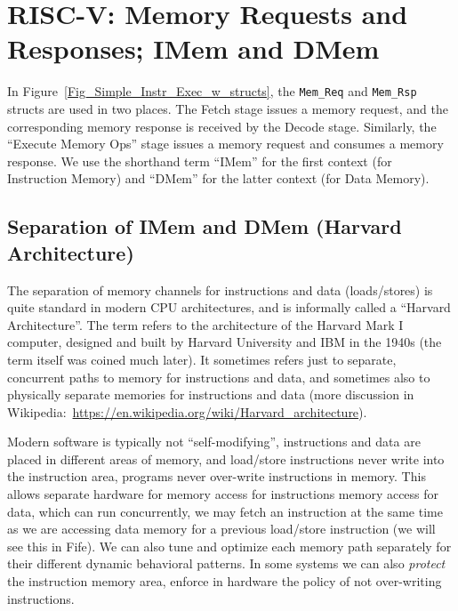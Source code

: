 
\section{RISC-V: Memory Requests and Responses; IMem and DMem}


In Figure~\ref{Fig_Simple_Instr_Exec_w_structs}, the \verb|Mem_Req|
and \verb|Mem_Rsp| structs are used in two places.  The Fetch stage
issues a memory request, and the corresponding memory response is
received by the Decode stage.  Similarly, the ``Execute Memory Ops''
stage issues a memory request and consumes a memory response.  We use
the shorthand term ``IMem'' for the first context (for Instruction
Memory) and ``DMem'' for the latter context (for Data Memory).


\subsection{Separation of IMem and DMem (Harvard Architecture)}

\label{Sec_Harvard_architecture}


The separation of memory channels for instructions and data
(loads/stores) is quite standard in modern CPU architectures, and is
informally called a ``Harvard Architecture''.  The term refers to the
architecture of the Harvard Mark I computer, designed and built by
Harvard University and IBM in the 1940s (the term itself was coined
much later).  It sometimes refers just to separate, concurrent paths
to memory for instructions and data, and sometimes also to physically
separate memories for instructions and data (more discussion in
Wikipedia:~\url{https://en.wikipedia.org/wiki/Harvard_architecture}).

Modern software is typically not ``self-modifying'', {\ie}
instructions and data are placed in different areas of memory, and
load/store instructions never write into the instruction area, {\ie}
programs never over-write instructions in memory.  This allows
separate hardware for memory access for instructions {\vs} memory
access for data, which can run concurrently, {\ie} we may fetch an
instruction at the same time as we are accessing data memory for a
previous load/store instruction (we will see this in Fife).  We can
also tune and optimize each memory path separately for their different
dynamic behavioral patterns.  In some systems we can also
\emph{protect} the instruction memory area, {\ie} enforce in hardware
the policy of not over-writing instructions.

